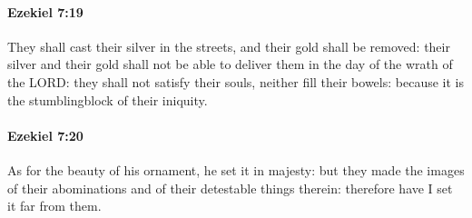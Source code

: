 		\paragraph{Ezekiel 7:19} %
			\label{EZEKIEL-7-19}

			They shall cast their silver in the streets, and their gold shall be removed: their silver and their gold shall not be able to deliver them in the day of the wrath of the LORD: they shall not satisfy their souls, neither fill their bowels: because it is the stumblingblock of their iniquity.


		\paragraph{Ezekiel 7:20} %
			\label{EZEKIEL-7-20}

			As for the beauty of his ornament, he set it in majesty: but they made the images of their abominations and of their detestable things therein: therefore have I set it far from them.

